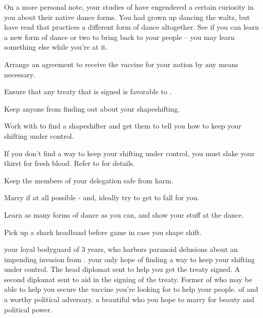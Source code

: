 \documentclass[char]{NeptuneBall}
\begin{document}
On a more personal note, your studies of \pAtlantis{} have engendered a certain curiosity in you about their native dance forms. You had grown up dancing the waltz, but have read that \pAtlantis{} practices a different form of dance altogether. See if you can learn a new form of dance or two to bring back to your people -- you may learn something else while you're at it.

\begin{itemz}[Goals]
  \item Arrange an agreement to receive the \ppolio{} vaccine for your nation by any means necessary.
	\item Ensure that any treaty that is signed is favorable to \pPacifica{}.
	\item Keep anyone from finding out about your shapeshifting.
	\item Work with \cBodyguard{} to find a shapeshifter and get them to tell you how to keep your shifting under control.
	\item If you don't find a way to keep your shifting under control, you must slake your thirst for fresh blood. Refer to \aBloodthirsty{} for details. 
	\item Keep the members of your delegation safe from harm.
	\item Marry \cPrincess{} if at all possible - and, ideally try to get \cPrincess{\them} to fall for you.
	\item Learn as many forms of dance as you can, and show your stuff at the dance.
\end{itemz}

\begin{itemz}[Notes]
  \item Pick up a shark headband before game in case you shape shift.
\end{itemz}

\begin{contacts}
  \contact{\cBodyguard{}} your loyal bodyguard of 3 years, who harbors paranoid delusions about an impending invasion from \pIndia{}. \cBodyguard{\They} \cBodyguard{\are} your only hope of finding a way to keep your shifting under control.
	\contact{\cDiplomat{}} The head diplomat sent to help you get the treaty signed.
	\contact{\cSpy{}} A second diplomat sent to aid in the signing of the treaty.
	\contact{\cAriel{}} Former \cAriel{\Prince} of \pAtlantis{} who may be able to help you secure the vaccine you're looking for to help your people.
	\contact{\cKing{}} \cKing{\King} of \pAtlantis{} and a worthy political adversary.
	\contact{\cPrincess{}} a beautiful \cPrincess{\Prince} who you hope to marry for \cPrincess{\their} beauty and political power.
\end{contacts}
\end{document}
